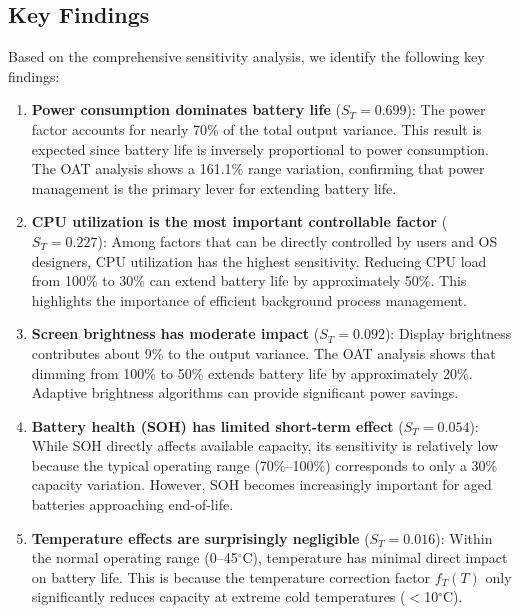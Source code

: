 \subsection{Key Findings}

Based on the comprehensive sensitivity analysis, we identify the following key findings:

\begin{enumerate}
    \item \textbf{Power consumption dominates battery life} ($S_T = 0.699$): 
    The power factor accounts for nearly 70\% of the total output variance. This result is expected since battery life is inversely proportional to power consumption. The OAT analysis shows a 161.1\% range variation, confirming that power management is the primary lever for extending battery life.
    
    \item \textbf{CPU utilization is the most important controllable factor} ($S_T = 0.227$):
    Among factors that can be directly controlled by users and OS designers, CPU utilization has the highest sensitivity. Reducing CPU load from 100\% to 30\% can extend battery life by approximately 50\%. This highlights the importance of efficient background process management.
    
    \item \textbf{Screen brightness has moderate impact} ($S_T = 0.092$):
    Display brightness contributes about 9\% to the output variance. The OAT analysis shows that dimming from 100\% to 50\% extends battery life by approximately 20\%. Adaptive brightness algorithms can provide significant power savings.
    
    \item \textbf{Battery health (SOH) has limited short-term effect} ($S_T = 0.054$):
    While SOH directly affects available capacity, its sensitivity is relatively low because the typical operating range (70\%--100\%) corresponds to only a 30\% capacity variation. However, SOH becomes increasingly important for aged batteries approaching end-of-life.
    
    \item \textbf{Temperature effects are surprisingly negligible} ($S_T = 0.016$):
    Within the normal operating range (0--45$^\circ$C), temperature has minimal direct impact on battery life. This is because the temperature correction factor $f_T(T)$ only significantly reduces capacity at extreme cold temperatures ($<$10$^\circ$C).
\end{enumerate}

